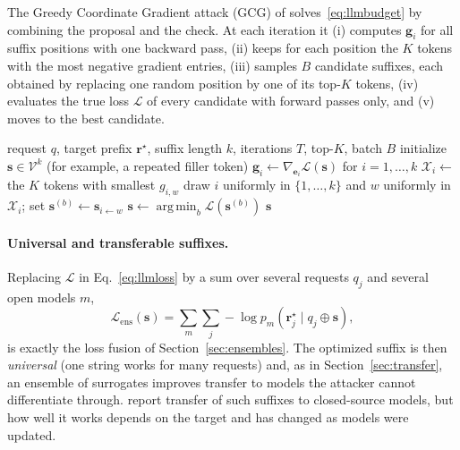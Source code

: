 \documentclass[10pt,a4paper]{extarticle}
\theoremstyle{definition}
\newcommand{\Loss}{\mathcal{L}}
\DeclareMathOperator*{\argmin}{arg\,min}
\begin{document}
The Greedy Coordinate Gradient attack (GCG) of \citet{zou2023universal} solves~\eqref{eq:llmbudget} by combining the proposal and the check. At each iteration it (i) computes \(\mathbf{g}_i\) for all suffix positions with one backward pass, (ii) keeps for each position the \(K\) tokens with the most negative gradient entries, (iii) samples \(B\) candidate suffixes, each obtained by replacing one random position by one of its top-\(K\) tokens, (iv) evaluates the true loss \(\Loss\) of every candidate with forward passes only, and (v) moves to the best candidate.

\begin{algorithm}[h]
\caption{GCG, suffix of length \(k\)}
\begin{algorithmic}[1]
\Require request \(q\), target prefix \(\mathbf{r}^\star\), suffix length \(k\), iterations \(T\), top-\(K\), batch \(B\)
\State initialize \(\mathbf{s}\in\mathcal{V}^k\) (for example, a repeated filler token)
  \State \(\mathbf{g}_i\gets\nabla_{\mathbf{e}_i}\Loss(\mathbf{s})\) for \(i=1,\dots,k\) 
  \State \(\mathcal{X}_i\gets\) the \(K\) tokens with smallest \(g_{i,w}\)
    \State draw \(i\) uniformly in \(\{1,\dots,k\}\) and \(w\) uniformly in \(\mathcal{X}_i\); set \(\mathbf{s}^{(b)}\gets\mathbf{s}_{i\leftarrow w}\)
  \EndFor
  \State \(\mathbf{s}\gets\argmin_b\Loss(\mathbf{s}^{(b)})\) 
\EndFor
\State \Return \(\mathbf{s}\)
\end{algorithmic}
\end{algorithm}

\paragraph{Universal and transferable suffixes.} Replacing \(\Loss\) in Eq.~\eqref{eq:llmloss} by a sum over several requests \(q_j\) and several open models \(m\),
\[
\Loss_{\mathrm{ens}}(\mathbf{s})=\sum_{m}\sum_{j}-\log p_m(\mathbf{r}^\star_j\mid q_j\oplus\mathbf{s}),
\]
is exactly the loss fusion of Section~\ref{sec:ensembles}. The optimized suffix is then \emph{universal} (one string works for many requests) and, as in Section~\ref{sec:transfer}, an ensemble of surrogates improves transfer to models the attacker cannot differentiate through. \citet{zou2023universal} report transfer of such suffixes to closed-source models, but how well it works depends on the target and has changed as models were updated.
\end{document}

